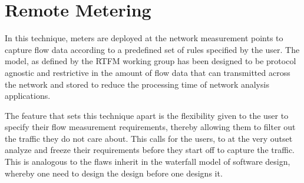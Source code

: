 \section{Remote Metering}\label{sec:remote-metering}
In this technique, meters are deployed at the network measurement points to capture flow data according to a predefined set of rules specified by the user. The model, as defined by the \ac{RTFM} working group \cite{rfc2722} has been designed to be protocol agnostic and restrictive in the amount of flow data that can transmitted across the network and stored to reduce the processing time of network analysis applications. 

The feature that sets this technique apart is the flexibility given to the user to specify their flow measurement requirements, thereby allowing them to filter out the traffic they do not care about. This calls for the users, to at the very outset analyze  and freeze their requirements before they start off to capture the traffic. This is analogous to the flaws inherit in the waterfall model \cite{wroyce:1987} of software design, whereby one need to design the design before one designs it.